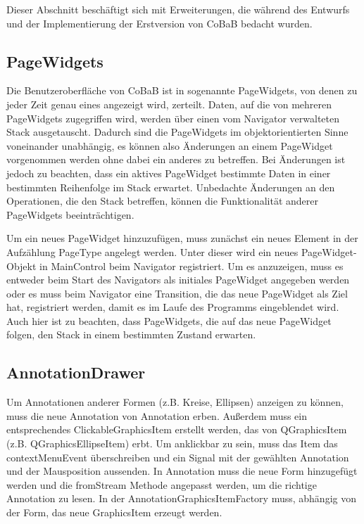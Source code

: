 Dieser Abschnitt beschäftigt sich mit Erweiterungen, die während des Entwurfs und der Implementierung der Erstversion von CoBaB bedacht wurden.

\subsection{PageWidgets}
Die Benutzeroberfläche von CoBaB ist in sogenannte PageWidgets, von denen zu jeder Zeit genau eines angezeigt wird, zerteilt.
Daten, auf die von mehreren PageWidgets zugegriffen wird, werden über einen vom Navigator verwalteten Stack ausgetauscht.
Dadurch sind die PageWidgets im objektorientierten Sinne voneinander unabhängig, es können also Änderungen an einem PageWidget vorgenommen werden ohne dabei ein anderes zu betreffen.
Bei Änderungen ist jedoch zu beachten, dass ein aktives PageWidget bestimmte Daten in einer bestimmten Reihenfolge im Stack erwartet.
Unbedachte Änderungen an den Operationen, die den Stack betreffen, können die Funktionalität anderer PageWidgets beeinträchtigen.

Um ein neues PageWidget hinzuzufügen, muss zunächst ein neues Element in der Aufzählung PageType angelegt werden. Unter dieser wird ein neues PageWidget-Objekt in MainControl beim Navigator registriert. Um es anzuzeigen, muss es entweder beim Start des Navigators als initiales PageWidget angegeben werden oder es muss beim Navigator eine Transition, die das neue PageWidget als Ziel hat, registriert werden, damit es im Laufe des Programms eingeblendet wird. Auch hier ist zu beachten, dass PageWidgets, die auf das neue PageWidget folgen, den Stack in einem bestimmten Zustand erwarten.

\subsection{AnnotationDrawer}
Um Annotationen anderer Formen (z.B. Kreise, Ellipsen) anzeigen zu können, muss die neue Annotation von Annotation erben. Außerdem muss ein entsprechendes ClickableGraphicsItem erstellt werden, das von QGraphicsItem (z.B. QGraphicsEllipseItem) erbt. Um anklickbar zu sein, muss das Item das contextMenuEvent überschreiben und ein Signal mit der gewählten Annotation und der Mausposition aussenden. In Annotation muss die neue Form hinzugefügt werden und die fromStream Methode angepasst werden, um die richtige Annotation zu lesen. In der AnnotationGraphicsItemFactory muss, abhängig von der Form, das neue GraphicsItem erzeugt werden.
